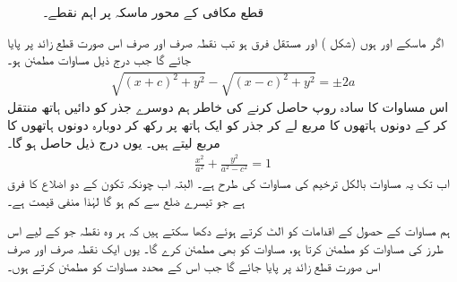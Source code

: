 \begin{figure}
\begin{minipage}{0.40\textwidth}
\caption{قطع مکافی کے محور ماسکہ پر  اہم نقطے۔}
\label{شکل_مخروط_قطع_زائد_ب}
\end{minipage}
\end{figure}

اگر ماسکے  اور  ہوں  (شکل ) اور مستقل فرق  ہو تب نقطہ  صرف اور صرف اس صورت قطع زائد پر پایا جائے گا جب درج ذیل مساوات  مطمئن ہو۔
\begin{align}\label{مساوات_مخروط_قطع_مکافی_الف}
\sqrt{(x+c)^2+y^2}-\sqrt{(x-c)^2+y^2}=\pm 2a
\end{align} 
اس مساوات کا سادہ روپ حاصل کرنے کی خاطر ہم دوسرے جذر کو دائیں ہاتھ منتقل کر کے دونوں ہاتھوں کا مربع لے کر جذر کو ایک ہاتھ  پر رکھ کر دوبارہ دونوں ہاتھوں کا مربع لیتے ہیں۔ یوں درج ذیل حاصل ہو گا۔
\begin{align}\label{مساوات_مخروط_قطع_مکافی_ب}
\frac{x^2}{a^2}+\frac{y^2}{a^2-c^2}=1
\end{align}
اب تک یہ مساوات بالکل ترخیم کی مساوات کی طرح ہے۔ البتہ اب چونکہ تکون  کے دو اضلاع کا فرق  ہے جو تیسرے ضلع  سے کم ہو گا لہٰذا  منفی قیمت ہے۔

ہم مساوات  کے حصول کے اقدامات کو الٹ کرتے ہوئے دکھا سکتے ہیں کہ ہر وہ نقطہ  جو  کے لیے اس طرز کی مساوات کو مطمئن کرتا ہو، مساوات  کو بھی مطمئن کرے گا۔ یوں ایک نقطہ صرف اور صرف اس صورت قطع زائد پر پایا جائے گا جب  اس کے محدد مساوات  کو مطمئن کرتے ہوں۔

